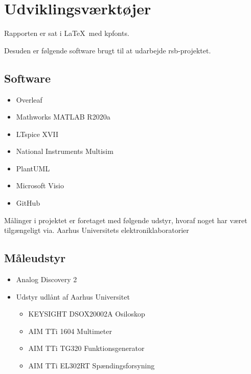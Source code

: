 \section{Udviklingsværktøjer}
Rapporten er sat i \LaTeX~med kpfonts.

Desuden er følgende software brugt til at udarbejde \gls{rsb}-projektet.
\subsection{Software}
\begin{itemize}
    \item Overleaf
    \item Mathworks MATLAB R2020a
    \item LTspice XVII
    \item National Instruments Multisim
    \item PlantUML
    \item Microsoft Visio
    \item GitHub
\end{itemize}

Målinger i projektet er foretaget med følgende udstyr, hvoraf noget har været tilgængeligt via. Aarhus Universitets elektroniklaboratorier
\subsection{Måleudstyr}
\begin{itemize}
    \item Analog Discovery 2
    \item Udstyr udlånt af Aarhus Universitet
          \begin{itemize}
              \item KEYSIGHT DSOX20002A Osiloskop
              \item AIM TTi 1604 Multimeter
              \item AIM TTi TG320 Funktionsgenerator
              \item AIM TTi EL302RT Spændingsforsyning
          \end{itemize}
\end{itemize}